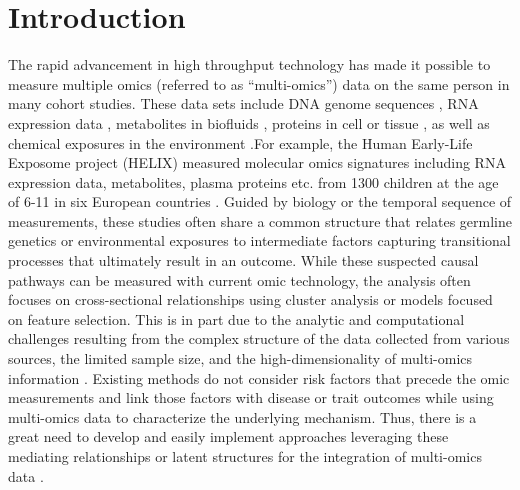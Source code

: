 \section{Introduction} \label{sec1}
The rapid advancement in high throughput technology has made it possible to measure multiple omics (referred to as ``multi-omics'') data on the same person in many cohort studies. These data sets include DNA genome sequences \citep{goodwin2016coming}, RNA expression data \citep{ozsolak2011rna}, metabolites in biofluids \citep{beger2013review}, proteins in cell or tissue \citep{aslam2017proteomics}, as well as chemical exposures in the environment \citep{wild2005complementing}.For example, the Human Early-Life Exposome project (HELIX) measured molecular omics signatures including RNA expression data, metabolites, plasma proteins etc. from 1300 children at the age of 6-11 in six European countries \citep{vrijheid2014human}. Guided by biology or the temporal sequence of measurements, these studies often share a common structure that relates germline genetics or environmental exposures to intermediate factors capturing transitional processes that ultimately result in an outcome. While these suspected causal pathways can be measured with current omic technology, the analysis often focuses on cross-sectional relationships using cluster analysis or models focused on feature selection. This is in part due to the analytic and computational challenges resulting from the complex structure of the data collected from various sources, the limited sample size, and the high-dimensionality of multi-omics information \citep{tini2019multi}. Existing methods do not consider risk factors that precede the omic measurements and link those factors with disease or trait outcomes while using multi-omics data to characterize the underlying mechanism. Thus, there is a great need to develop and easily implement approaches leveraging these mediating relationships or latent structures for the integration of multi-omics data \citep{subramanian2020multi}. 
